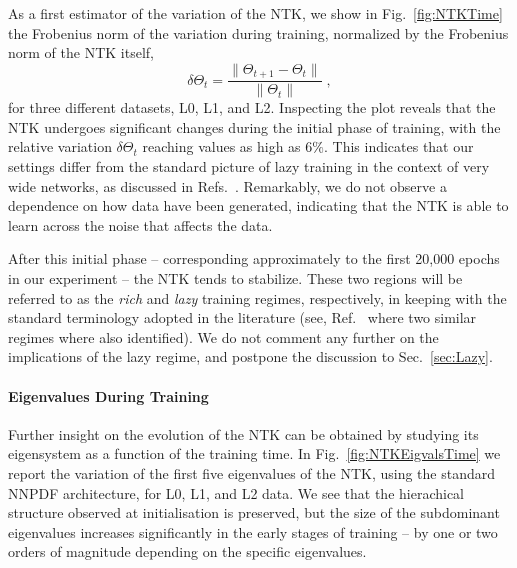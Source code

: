 As a first estimator of the variation of the NTK, we show in
Fig.~\ref{fig:NTKTime} the Frobenius norm of the variation during training,
normalized by the Frobenius norm of the NTK itself, 
\begin{equation}
\delta \Theta_t = \frac{\lVert \Theta_{t+1} - \Theta_t \rVert}{\lVert \Theta_t \rVert} \;,
\label{eq:DeltaNTK}
\end{equation}
for three different datasets, L0, L1, and L2. Inspecting the plot reveals that
the NTK undergoes significant changes during the initial phase of training, with
the relative variation $\delta \Theta_t$ reaching values as high as $6\%$. This
indicates that our settings differ from the standard picture of lazy training in
the context of very wide networks, as discussed in
Refs.~\cite{jacot2018neural,Roberts:2021fes,lee2019wide}. Remarkably, we do not
observe a dependence on how data have been generated, indicating that the NTK is
able to learn across the noise that affects the data. 

After this initial phase -- corresponding approximately to the first 20,000
epochs in our experiment -- the NTK tends to stabilize. These two regions will
be referred to as the \textit{rich} and \textit{lazy} training regimes,
respectively, in keeping with the standard terminology adopted in the literature
(see, \eg Ref.~\cite{fort2020dlvk} where two similar regimes where also
identified). We do not comment any further on the implications of the lazy
regime, and postpone the discussion to Sec.~\ref{sec:Lazy}.

\FloatBarrier

\paragraph{Eigenvalues During Training}

Further insight on the evolution of the NTK can be obtained by studying its
eigensystem as a function of the training time. In Fig.~\ref{fig:NTKEigvalsTime}
we report the variation of the first five eigenvalues of the NTK, using the
standard NNPDF architecture, for L0, L1, and L2 data. We see that the
hierachical structure observed at initialisation is preserved, but the size of
the subdominant eigenvalues increases significantly in the early stages of
training -- by one or two orders of magnitude depending on the specific
eigenvalues. 

